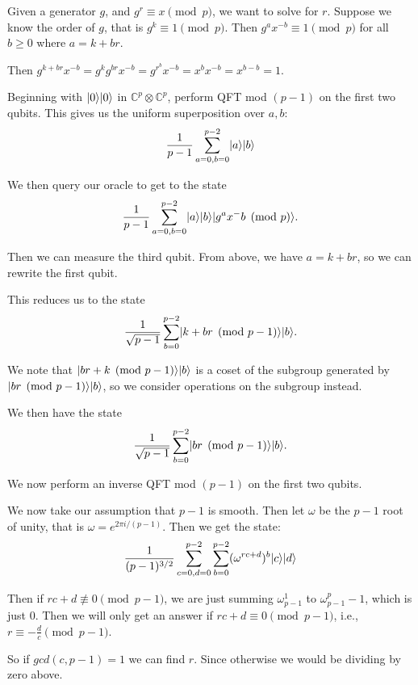 \documentclass[letterpaper]{article}
\DeclarePairedDelimiter{\ket}{\lvert}{\rangle}
\begin{document}
Given a generator $g$, and $g^r\equiv x\pmod{p}$, we want to solve for $r$.
Suppose we know the order of $g$, that is $g^k\equiv 1\pmod{p}$.
Then $g^ax^{-b}\equiv 1 \pmod{p}$ for all $b\ge 0$ where $a=k+br$.

Then $g^{k+br}x^{-b}=g^kg^{br}x^{-b}=g^{r^b}x^{-b}=x^bx^{-b}=x^{b-b}=1$.


Beginning with $\ket{0}\ket{0}$ in $\mathbb{C}^p\otimes\mathbb{C}^p$, perform QFT mod $(p-1)$ on the first two qubits.
This gives us the uniform superposition over $a, b$:
\[\frac{1}{p-1}\sum_{a=0,b=0}^{p-2}\ket{a}\ket{b}\]

We then query our oracle to get to the state
\[\frac{1}{p-1}\sum_{a=0,b=0}^{p-2}\ket{a}\ket{b}\ket{g^ax^-b\pmod{p}}.\]

Then we can measure the third qubit. From above, we have $a=k+br$, so we can rewrite the first qubit.

This reduces us to the state
\[\frac{1}{\sqrt{p-1}}\sum_{b=0}^{p-2}\ket{k+br\pmod{p-1}}\ket{b}.\]

We note that $\ket{br+k\pmod{p-1}}\ket{b}$ is a coset of the subgroup generated by $\ket{br \pmod{p-1}}\ket{b}$, so we consider operations on the subgroup instead.

We then have the state
\[\frac{1}{\sqrt{p-1}}\sum_{b=0}^{p-2}\ket{br\pmod{p-1}}\ket{b}.\]

We now perform an inverse QFT mod $(p-1)$ on the first two qubits.

We now take our assumption that $p-1$ is smooth. Then let $\omega$ be the $p-1$ root of unity, that is $\omega=e^{2\pi i/(p-1)}$. Then we get the state:
\[\frac{1}{(p-1)^{3/2}}\sum_{c=0,d=0}^{p-2}\sum_{b=0}^{p-2}(\omega^{rc+d})^b\ket{c}\ket{d}\]

Then if $rc+d \not\equiv 0 \pmod{p-1}$, we are just summing $\omega_{p-1}^1$ to
$\omega_{p-1}^p-1$, which is just $0$. Then we will only get an answer if $rc+d
\equiv 0 \pmod{p-1}$, i.e., $r \equiv -\frac{d}{c} \pmod{p-1}$.

So if $gcd(c,p-1)=1$ we can find $r$. Since otherwise we would be dividing by
zero above.
	
\end{document}

